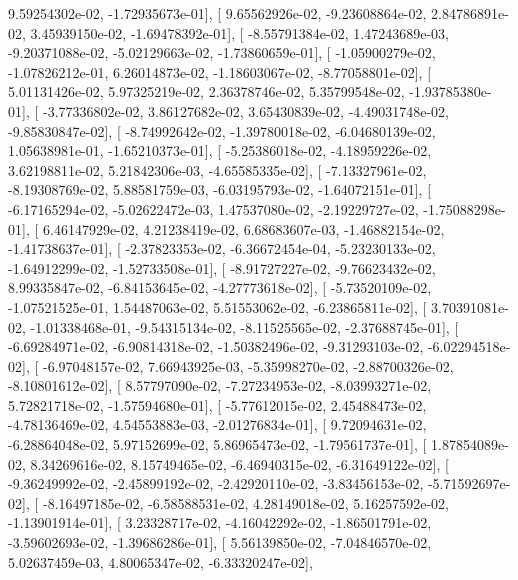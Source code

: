 \documentclass{article}
\begin{document}
          9.59254302e-02,  -1.72935673e-01],
       [  9.65562926e-02,  -9.23608864e-02,   2.84786891e-02,
          3.45939150e-02,  -1.69478392e-01],
       [ -8.55791384e-02,   1.47243689e-03,  -9.20371088e-02,
         -5.02129663e-02,  -1.73860659e-01],
       [ -1.05900279e-02,  -1.07826212e-01,   6.26014873e-02,
         -1.18603067e-02,  -8.77058801e-02],
       [  5.01131426e-02,   5.97325219e-02,   2.36378746e-02,
          5.35799548e-02,  -1.93785380e-01],
       [ -3.77336802e-02,   3.86127682e-02,   3.65430839e-02,
         -4.49031748e-02,  -9.85830847e-02],
       [ -8.74992642e-02,  -1.39780018e-02,  -6.04680139e-02,
          1.05638981e-01,  -1.65210373e-01],
       [ -5.25386018e-02,  -4.18959226e-02,   3.62198811e-02,
          5.21842306e-03,  -4.65585335e-02],
       [ -7.13327961e-02,  -8.19308769e-02,   5.88581759e-03,
         -6.03195793e-02,  -1.64072151e-01],
       [ -6.17165294e-02,  -5.02622472e-03,   1.47537080e-02,
         -2.19229727e-02,  -1.75088298e-01],
       [  6.46147929e-02,   4.21238419e-02,   6.68683607e-03,
         -1.46882154e-02,  -1.41738637e-01],
       [ -2.37823353e-02,  -6.36672454e-04,  -5.23230133e-02,
         -1.64912299e-02,  -1.52733508e-01],
       [ -8.91727227e-02,  -9.76623432e-02,   8.99335847e-02,
         -6.84153645e-02,  -4.27773618e-02],
       [ -5.73520109e-02,  -1.07521525e-01,   1.54487063e-02,
          5.51553062e-02,  -6.23865811e-02],
       [  3.70391081e-02,  -1.01338468e-01,  -9.54315134e-02,
         -8.11525565e-02,  -2.37688745e-01],
       [ -6.69284971e-02,  -6.90814318e-02,  -1.50382496e-02,
         -9.31293103e-02,  -6.02294518e-02],
       [ -6.97048157e-02,   7.66943925e-03,  -5.35998270e-02,
         -2.88700326e-02,  -8.10801612e-02],
       [  8.57797090e-02,  -7.27234953e-02,  -8.03993271e-02,
          5.72821718e-02,  -1.57594680e-01],
       [ -5.77612015e-02,   2.45488473e-02,  -4.78136469e-02,
          4.54553883e-03,  -2.01276834e-01],
       [  9.72094631e-02,  -6.28864048e-02,   5.97152699e-02,
          5.86965473e-02,  -1.79561737e-01],
       [  1.87854089e-02,   8.34269616e-02,   8.15749465e-02,
         -6.46940315e-02,  -6.31649122e-02],
       [ -9.36249992e-02,  -2.45899192e-02,  -2.42920110e-02,
         -3.83456153e-02,  -5.71592697e-02],
       [ -8.16497185e-02,  -6.58588531e-02,   4.28149018e-02,
          5.16257592e-02,  -1.13901914e-01],
       [  3.23328717e-02,  -4.16042292e-02,  -1.86501791e-02,
         -3.59602693e-02,  -1.39686286e-01],
       [  5.56139850e-02,  -7.04846570e-02,   5.02637459e-03,
          4.80065347e-02,  -6.33320247e-02],
\end{document}

